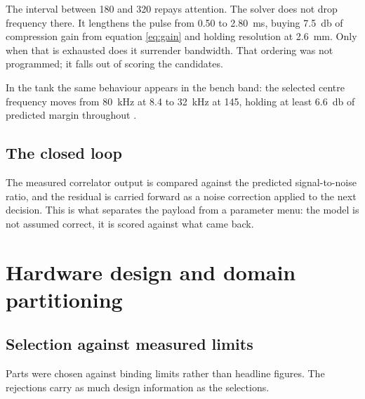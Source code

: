\documentclass[11pt,a4paper]{article}
\begin{document}
The interval between \SI{180}{} and \SI{320}{\NTU} repays attention. The solver
does not drop frequency there. It lengthens the pulse from \SI{0.50}{} to
\SI{2.80}{\milli\second}, buying \SI{7.5}{\decibel} of compression gain from
equation \eqref{eq:gain} and holding resolution at \SI{2.6}{\milli\metre}. Only
when that is exhausted does it surrender bandwidth. That ordering was not
programmed; it falls out of scoring the candidates.

In the tank the same behaviour appears in the bench band: the selected centre
frequency moves from \SI{80}{\kilo\hertz} at \SI{8.4}{\NTU} to
\SI{32}{\kilo\hertz} at \SI{145}{\NTU}, holding at least \SI{6.6}{\decibel} of
predicted margin throughout .

\subsection{The closed loop}

The measured correlator output is compared against the predicted
signal-to-noise ratio, and the residual is carried forward as a noise
correction applied to the next decision. This is what separates the payload
from a parameter menu: the model is not assumed correct, it is scored against
what came back.


\section{Hardware design and domain partitioning}
\label{sec:hardware}

\subsection{Selection against measured limits}

Parts were chosen against binding limits rather than headline figures. The
rejections carry as much design information as the selections.
\end{document}
